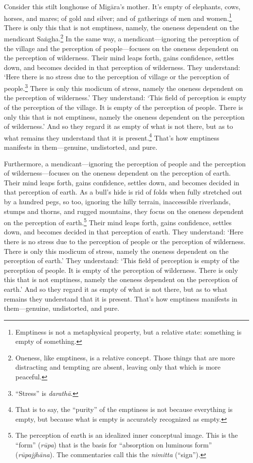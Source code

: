 \documentclass[12pt,openany]{book}%
\begin{document}
Consider this stilt longhouse of \textsanskrit{Migāra}’s mother. It’s empty of elephants, cows, horses, and mares; of gold and silver; and of gatherings of men and women.\footnote{Emptiness is not a metaphysical property, but a relative state: something is empty of something. } There is only this that is not emptiness, namely, the oneness dependent on the mendicant \textsanskrit{Saṅgha}.\footnote{Oneness, like emptiness, is a relative concept. Those things that are more distracting and tempting are absent, leaving only that which is more peaceful. } In the same way, a mendicant—ignoring the perception of the village and the perception of people—focuses on the oneness dependent on the perception of wilderness. Their mind leaps forth, gains confidence, settles down, and becomes decided in that perception of wilderness. They understand: ‘Here there is no stress due to the perception of village or the perception of people.\footnote{“Stress” is \textit{\textsanskrit{darathā}}. } There is only this modicum of stress, namely the oneness dependent on the perception of wilderness.’ They understand: ‘This field of perception is empty of the perception of the village. It is empty of the perception of people. There is only this that is not emptiness, namely the oneness dependent on the perception of wilderness.’ And so they regard it as empty of what is not there, but as to what remains they understand that it is present.\footnote{That is to say, the “purity” of the emptiness is not because everything is empty, but because what is empty is accurately recognized as empty. } That’s how emptiness manifests in them—genuine, undistorted, and pure. 

Furthermore, a mendicant—ignoring the perception of people and the perception of wilderness—focuses on the oneness dependent on the perception of earth. Their mind leaps forth, gains confidence, settles down, and becomes decided in that perception of earth. As a bull’s hide is rid of folds when fully stretched out by a hundred pegs, so too, ignoring the hilly terrain, inaccessible riverlands, stumps and thorns, and rugged mountains, they focus on the oneness dependent on the perception of earth.\footnote{The perception of earth is an idealized inner conceptual image. This is the “form” (\textit{\textsanskrit{rūpa}}) that is the basis for “absorption on luminous form” (\textit{\textsanskrit{rūpajjhāna}}). The commentaries call this the \textit{nimitta} (“sign”). } Their mind leaps forth, gains confidence, settles down, and becomes decided in that perception of earth. They understand: ‘Here there is no stress due to the perception of people or the perception of wilderness. There is only this modicum of stress, namely the oneness dependent on the perception of earth.’ They understand: ‘This field of perception is empty of the perception of people. It is empty of the perception of wilderness. There is only this that is not emptiness, namely the oneness dependent on the perception of earth.’ And so they regard it as empty of what is not there, but as to what remains they understand that it is present. That’s how emptiness manifests in them—genuine, undistorted, and pure. 
\end{document}
